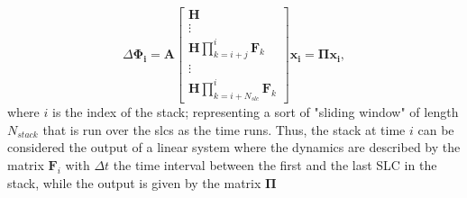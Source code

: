\documentclass{article}
\begin{document}
\begin{equation}\label{eq:stack_output}
	\Delta\mathbf{\Phi_{i}} = \mathbf{A} 
			 \begin{bmatrix}
			 	\mathbf{H}\\
			 	\vdots\\
			 	\mathbf{H} \prod_{k=i+j}^{i}\mathbf{F}_k\\
			 	\vdots\\
			 	\mathbf{H} \prod_{k=i+N_{slc}}^{i}\mathbf{F}_k
			 \end{bmatrix}\mathbf{x_i} = \mathbf{\Pi} \mathbf{x_i},
\end{equation}
where $i$ is the index of the stack; representing a sort of "sliding window" of length $N_{stack}$ that is run over the slcs as the time runs.
Thus, the stack at time $i$ can be considered the output of a linear system where the dynamics are described by the matrix $\mathbf{F}_i$ with $\Delta t$ the time interval between the first and the last SLC in the stack, while the output is given by the matrix $\mathbf{\Pi}$
\end{document}
